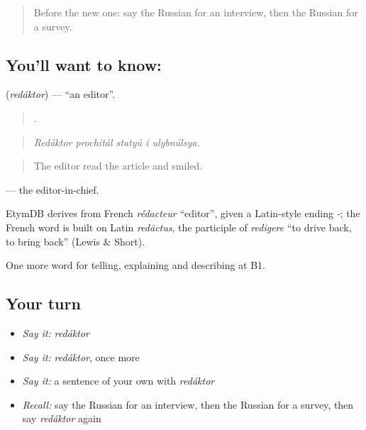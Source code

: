 \label{lesson:RU-C284-redaktor}



\begin{quote}
Before the new one: say the Russian for an interview, then the Russian for a survey.
\end{quote}

\subsection*{You'll want to know: }
\textbf{} (\emph{redáktor}) — \textquotedblleft{}an editor\textquotedblright{}.

\begin{quote}
    .
\end{quote}

\begin{quote}
\emph{Redáktor prochitál statyú i ulybnúlsya.}
\end{quote}

\begin{quote}
The editor read the article and smiled.
\end{quote}

\emph{ } — the editor-in-chief.

\begin{cousinweb}
EtymDB derives \emph{} from French \emph{rédacteur} \textquotedblleft{}editor\textquotedblright{}, given a Latin-style ending \emph{-}; the French word is built on Latin \emph{redāctus}, the participle of \emph{redigere} \textquotedblleft{}to drive back, to bring back\textquotedblright{} (Lewis \& Short).
\end{cousinweb}

\begin{grammarlens}[title={What you've built}]
One more word for telling, explaining and describing at B1.
\end{grammarlens}

\subsection*{Your turn}
\begin{itemize}
\raggedright
  \item \emph{Say it:} \emph{redáktor}
  \item \emph{Say it:} \emph{redáktor}, once more
  \item \emph{Say it:} a sentence of your own with \emph{redáktor}
  \item \emph{Recall:} say the Russian for an interview, then the Russian for a survey, then say \emph{redáktor} again
\end{itemize}

